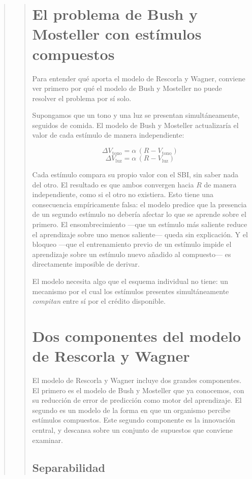 \documentclass[
  letterpaper,
  DIV=11,
  numbers=noendperiod]{scrreprt}
\begin{document}
\begin{tcolorbox}[enhanced jigsaw, toprule=.15mm, arc=.35mm, colback=white, opacityback=0, colframe=quarto-callout-note-color-frame, breakable, rightrule=.15mm, left=2mm, leftrule=.75mm, bottomrule=.15mm]
\begin{quote}
\begin{quote}
\section{El problema de Bush y Mosteller con estímulos
compuestos}\label{el-problema-de-bush-y-mosteller-con-estuxedmulos-compuestos}

Para entender qué aporta el modelo de Rescorla y Wagner, conviene ver
primero por qué el modelo de Bush y Mosteller no puede resolver el
problema por sí solo.

Supongamos que un tono y una luz se presentan simultáneamente, seguidos
de comida. El modelo de Bush y Mosteller actualizaría el valor de cada
estímulo de manera independiente:

\[\Delta V_{\text{tono}} = \alpha\,(R - V_{\text{tono}})\]
\[\Delta V_{\text{luz}} = \alpha\,(R - V_{\text{luz}})\]

Cada estímulo compara su propio valor con el SBI, sin saber nada del
otro. El resultado es que ambos convergen hacia \(R\) de manera
independiente, como si el otro no existiera. Esto tiene una consecuencia
empíricamente falsa: el modelo predice que la presencia de un segundo
estímulo no debería afectar lo que se aprende sobre el primero. El
ensombrecimiento ---que un estímulo más saliente reduce el aprendizaje
sobre uno menos saliente--- queda sin explicación. Y el bloqueo ---que
el entrenamiento previo de un estímulo impide el aprendizaje sobre un
estímulo nuevo añadido al compuesto--- es directamente imposible de
derivar.

El modelo necesita algo que el esquema individual no tiene: un mecanismo
por el cual los estímulos presentes simultáneamente \emph{compitan}
entre sí por el crédito disponible.

\section{Dos componentes del modelo de Rescorla y
Wagner}\label{dos-componentes-del-modelo-de-rescorla-y-wagner}

El modelo de Rescorla y Wagner incluye dos grandes componentes. El
primero es el modelo de Bush y Mosteller que ya conocemos, con su
reducción de error de predicción como motor del aprendizaje. El segundo
es un modelo de la forma en que un organismo percibe estímulos
compuestos. Este segundo componente es la innovación central, y descansa
sobre un conjunto de supuestos que conviene examinar.

\subsection{Separabilidad}\label{separabilidad}


\end{quote}
\end{quote}
\end{tcolorbox}
\end{document}
